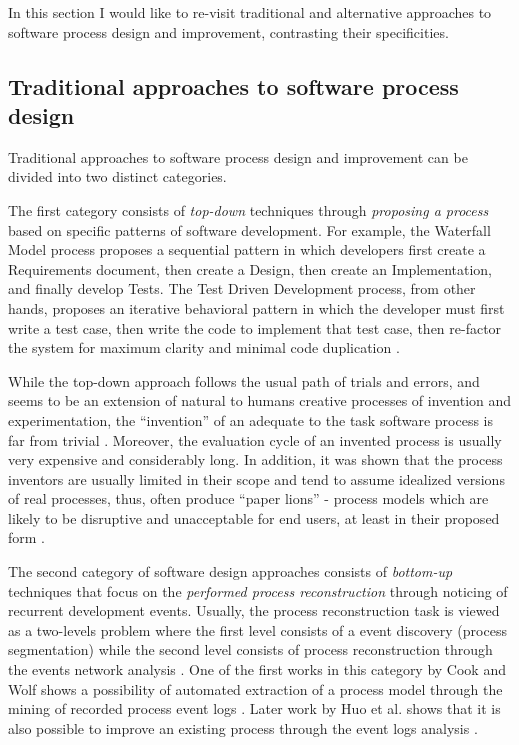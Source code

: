 In this section I would like to re-visit traditional and alternative approaches to software process
design and improvement, contrasting their specificities.

\subsection{Traditional approaches to software process design}\label{sec_traditional_software_processes}
Traditional approaches to software process design and improvement can be divided into two 
distinct categories. 

The first category consists of \textit{top-down} techniques through \textit{proposing a process} based 
on specific patterns of software development. 
For example, the Waterfall Model process proposes a sequential pattern in which developers first create a 
Requirements document, then create a Design, then create an Implementation, and finally develop Tests. 
The Test Driven Development process, from other hands, proposes an iterative behavioral pattern in which
the developer must first write a test case, then write the code to implement that test case, then re-factor the 
system for maximum clarity and minimal code duplication \cite{citeulike:6086365}. 

While the top-down approach follows the usual path of trials and errors, and seems to be an 
extension of natural to humans creative processes of invention and experimentation, 
the ``invention'' of an adequate to the task software process is far from trivial 
\cite{citeulike:5043104} \cite{citeulike:1986013}. 
Moreover, the evaluation cycle of an invented process is usually very expensive and considerably long.
In addition, it was shown that the process inventors are usually limited in their scope and tend to 
assume idealized versions of real processes, thus, often produce ``paper lions'' - process models which are 
likely to be disruptive and unacceptable for end users, at least in their proposed form \cite{citeulike:9758924}.

The second category of software design approaches consists of \textit{bottom-up} techniques that focus 
on the \textit{performed process reconstruction} through noticing of recurrent development events. 
Usually, the process reconstruction task is viewed as a two-levels problem where the first level 
consists of a event discovery (process segmentation) while the second level consists of process 
reconstruction through the events network analysis \cite{citeulike:2703162}.
One of the first works in this category by Cook and Wolf shows a possibility of automated extraction 
of a process model through the mining of recorded process event logs 
\cite{citeulike:328044} \cite{citeulike:5120757} \cite{citeulike:5128143}. 
Later work by Huo et al. shows that it is also possible to improve an existing process
through the event logs analysis \cite{citeulike:7691059} \cite{citeulike:7690766}. 

